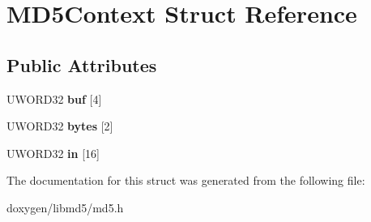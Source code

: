 \hypertarget{struct_m_d5_context}{}\section{M\+D5\+Context Struct Reference}
\label{struct_m_d5_context}
\subsection*{Public Attributes}
\begin{DoxyCompactItemize}
\item 
\mbox{\label{struct_m_d5_context_ab50609f4b1d5f31af6d1045957aabe91}} 
U\+W\+O\+R\+D32 {\bfseries buf} \mbox{[}4\mbox{]}
\item 
\mbox{\label{struct_m_d5_context_a51a39f313507eff8f5ef823d75035d41}} 
U\+W\+O\+R\+D32 {\bfseries bytes} \mbox{[}2\mbox{]}
\item 
\mbox{\label{struct_m_d5_context_ac2d5f8af04d15c256eecb635bdaf52c3}} 
U\+W\+O\+R\+D32 {\bfseries in} \mbox{[}16\mbox{]}
\end{DoxyCompactItemize}


The documentation for this struct was generated from the following file\+:\begin{DoxyCompactItemize}
\item 
doxygen/libmd5/md5.\+h\end{DoxyCompactItemize}
